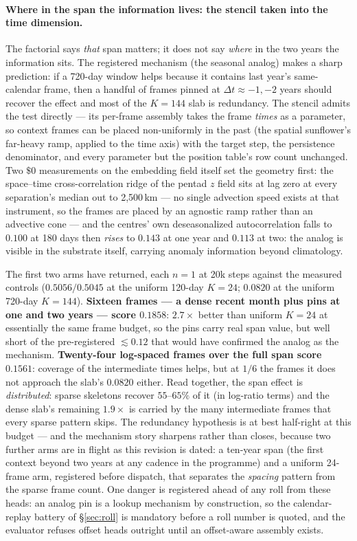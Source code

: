 \documentclass[10pt]{article}
\begin{document}
\paragraph{Where in the span the information lives: the stencil taken
into the time dimension.} The factorial says \emph{that} span matters;
it does not say \emph{where} in the two years the information sits. The
registered mechanism (the seasonal analog) makes a sharp prediction: if
a 720-day window helps because it contains last year's same-calendar
frame, then a handful of frames pinned at $\Delta t \approx -1, -2$
years should recover the effect and most of the $K{=}144$ slab is
redundancy. The stencil admits the test directly --- its per-frame
assembly takes the frame \emph{times} as a parameter, so context frames
can be placed non-uniformly in the past (the spatial sunflower's
far-heavy ramp, applied to the time axis) with the target step, the
persistence denominator, and every parameter but the position table's
row count unchanged. Two $\$0$ measurements on the embedding field
itself set the geometry first: the space--time cross-correlation ridge
of the pentad $z$ field sits at lag zero at every separation's median
out to 2{,}500\,km --- no single advection speed exists at that
instrument, so the frames are placed by an agnostic ramp rather than an
advective cone --- and the centres' own deseasonalized autocorrelation
falls to $0.100$ at 180 days then \emph{rises} to $0.143$ at one year
and $0.113$ at two: the analog is visible in the substrate itself,
carrying anomaly information beyond climatology.

The first two arms have returned, each $n{=}1$ at 20k steps against the
measured controls ($0.5056/0.5045$ at the uniform 120-day $K{=}24$;
$0.0820$ at the uniform 720-day $K{=}144$). \textbf{Sixteen frames ---
a dense recent month plus pins at one and two years --- score
$0.1858$}: $2.7\times$ better than uniform $K{=}24$ at essentially the
same frame budget, so the pins carry real span value, but well short of
the pre-registered $\lesssim 0.12$ that would have confirmed the analog
as the mechanism. \textbf{Twenty-four log-spaced frames over the full
span score $0.1561$}: coverage of the intermediate times helps, but at
$1/6$ the frames it does not approach the slab's $0.0820$ either. Read
together, the span effect is \emph{distributed}: sparse skeletons
recover $55$--$65\%$ of it (in log-ratio terms) and the dense slab's
remaining $1.9\times$ is carried by the many intermediate frames that
every sparse pattern skips. The redundancy hypothesis is at best
half-right at this budget --- and the mechanism story sharpens rather
than closes, because two further arms are in flight as this revision is
dated: a ten-year span (the first context beyond two years at any
cadence in the programme) and a uniform 24-frame arm, registered before
dispatch, that separates the \emph{spacing} pattern from the sparse
frame count. One danger is registered ahead of any roll from these
heads: an analog pin is a lookup mechanism by construction, so the
calendar-replay battery of \S\ref{sec:roll} is mandatory before a roll
number is quoted, and the evaluator refuses offset heads outright until
an offset-aware assembly exists.
\end{document}
